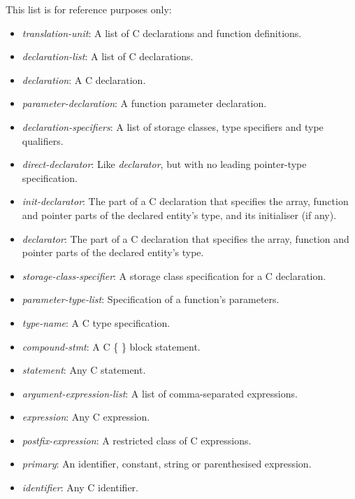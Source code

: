 \documentclass[11pt,letterpaper]{article}
\begin{document}
This list is for reference purposes only:
\begin{itemize}
\item \emph{translation-unit}: A list of C declarations and function
definitions.

\item \emph{declaration-list}: A list of C declarations.

\item \emph{declaration}: A C declaration.

\item \emph{parameter-declaration}: A function parameter declaration.

\item \emph{declaration-specifiers}: A list of storage classes, type
specifiers and type qualifiers.

\item \emph{direct-declarator}: Like \emph{declarator}, but with no
leading pointer-type specification.

\item \emph{init-declarator}: The part of a C declaration that specifies
the array, function and pointer parts of the declared entity's type, and
its initialiser (if any).

\item \emph{declarator}: The part of a C declaration that specifies
the array, function and pointer parts of the declared entity's type.

\item \emph{storage-class-specifier}: A storage class specification for
a C declaration.

\item \emph{parameter-type-list}: Specification of a function's parameters.

\item \emph{type-name}: A C type specification.

\item \emph{compound-stmt}: A C \{ \} block statement.

\item \emph{statement}: Any C statement.

\item \emph{argument-expression-list}: A list of comma-separated
expressions.

\item \emph{expression}: Any C expression.

\item \emph{postfix-expression}: A restricted class of C expressions.

\item \emph{primary}: An identifier, constant, string or parenthesised
expression.

\item \emph{identifier}: Any C identifier.
\end{itemize}
\end{document}
